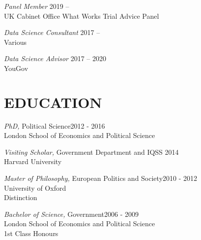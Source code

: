 \documentclass[centered]{res}
\begin{document}
\begin{resume}
\vspace{.5cm}

{\sl Panel Member} \hfill 2019 --\\
UK Cabinet Office What Works Trial Advice Panel

{\sl Data Science Consultant} \hfill 2017 -- \\
Various

{\sl Data Science Advisor} \hfill 2017 -- 2020\\
YouGov



\section{EDUCATION} 

\vspace{.5cm}

		{\sl PhD,} Political Science\hfill 2012 - 2016\\
                London School of Economics and Political Science

		{\sl Visiting Scholar,} Government Department and IQSS \hfill  2014\\
                 Harvard University  

		{\sl Master of Philosophy,} European Politics and Society\hfill 2010 - 2012 \\
                University of Oxford \\
               Distinction 

		{\sl Bachelor of Science,} Government\hfill 2006 - 2009 \\
                London School of Economics and Political Science \\
                1st Class Honours 



\end{resume}
\end{document}
